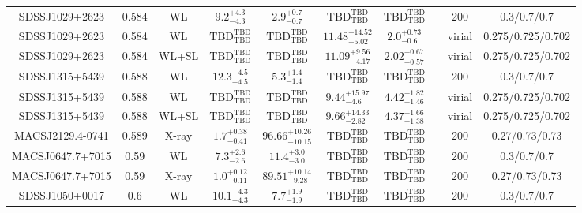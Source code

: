 \begin{table}
\begin{tabular}{cccccccccc}
SDSSJ1029+2623 & 0.584 & WL & ${9.2}^{+4.3}_{-4.3}$ & ${2.9}^{+0.7}_{-0.7}$ & ${\mathrm{TBD}}^{\mathrm{TBD}}_{\mathrm{TBD}}$ & ${\mathrm{TBD}}^{\mathrm{TBD}}_{\mathrm{TBD}}$ & \citet{SE14.1} & 200 & 0.3/0.7/0.7 \\
SDSSJ1029+2623 & 0.584 & WL & ${\mathrm{TBD}}^{\mathrm{TBD}}_{\mathrm{TBD}}$ & ${\mathrm{TBD}}^{\mathrm{TBD}}_{\mathrm{TBD}}$ & ${11.48}^{+14.52}_{-5.02}$ & ${2.0}^{+0.73}_{-0.6}$ & \citet{OG12.1} & virial & 0.275/0.725/0.702 \\
SDSSJ1029+2623 & 0.584 & WL+SL & ${\mathrm{TBD}}^{\mathrm{TBD}}_{\mathrm{TBD}}$ & ${\mathrm{TBD}}^{\mathrm{TBD}}_{\mathrm{TBD}}$ & ${11.09}^{+9.56}_{-4.17}$ & ${2.02}^{+0.67}_{-0.57}$ & \citet{OG12.1} & virial & 0.275/0.725/0.702 \\
SDSSJ1315+5439 & 0.588 & WL & ${12.3}^{+4.5}_{-4.5}$ & ${5.3}^{+1.4}_{-1.4}$ & ${\mathrm{TBD}}^{\mathrm{TBD}}_{\mathrm{TBD}}$ & ${\mathrm{TBD}}^{\mathrm{TBD}}_{\mathrm{TBD}}$ & \citet{SE14.1} & 200 & 0.3/0.7/0.7 \\
SDSSJ1315+5439 & 0.588 & WL & ${\mathrm{TBD}}^{\mathrm{TBD}}_{\mathrm{TBD}}$ & ${\mathrm{TBD}}^{\mathrm{TBD}}_{\mathrm{TBD}}$ & ${9.44}^{+15.97}_{-4.6}$ & ${4.42}^{+1.82}_{-1.46}$ & \citet{OG12.1} & virial & 0.275/0.725/0.702 \\
SDSSJ1315+5439 & 0.588 & WL+SL & ${\mathrm{TBD}}^{\mathrm{TBD}}_{\mathrm{TBD}}$ & ${\mathrm{TBD}}^{\mathrm{TBD}}_{\mathrm{TBD}}$ & ${9.66}^{+14.33}_{-2.82}$ & ${4.37}^{+1.66}_{-1.38}$ & \citet{OG12.1} & virial & 0.275/0.725/0.702 \\
MACSJ2129.4-0741 & 0.589 & X-ray & ${1.7}^{+0.38}_{-0.41}$ & ${96.66}^{+10.26}_{-10.15}$ & ${\mathrm{TBD}}^{\mathrm{TBD}}_{\mathrm{TBD}}$ & ${\mathrm{TBD}}^{\mathrm{TBD}}_{\mathrm{TBD}}$ & \citet{BA14.1} & 200 & 0.27/0.73/0.73 \\
MACSJ0647.7+7015 & 0.59 & WL & ${7.3}^{+2.6}_{-2.6}$ & ${11.4}^{+3.0}_{-3.0}$ & ${\mathrm{TBD}}^{\mathrm{TBD}}_{\mathrm{TBD}}$ & ${\mathrm{TBD}}^{\mathrm{TBD}}_{\mathrm{TBD}}$ & \citet{SE14.1} & 200 & 0.3/0.7/0.7 \\
MACSJ0647.7+7015 & 0.59 & X-ray & ${1.0}^{+0.12}_{-0.11}$ & ${89.51}^{+10.14}_{-9.28}$ & ${\mathrm{TBD}}^{\mathrm{TBD}}_{\mathrm{TBD}}$ & ${\mathrm{TBD}}^{\mathrm{TBD}}_{\mathrm{TBD}}$ & \citet{BA14.1} & 200 & 0.27/0.73/0.73 \\
SDSSJ1050+0017 & 0.6 & WL & ${10.1}^{+4.3}_{-4.3}$ & ${7.7}^{+1.9}_{-1.9}$ & ${\mathrm{TBD}}^{\mathrm{TBD}}_{\mathrm{TBD}}$ & ${\mathrm{TBD}}^{\mathrm{TBD}}_{\mathrm{TBD}}$ & \citet{SE14.1} & 200 & 0.3/0.7/0.7 \\

\end{tabular}
\end{table}

